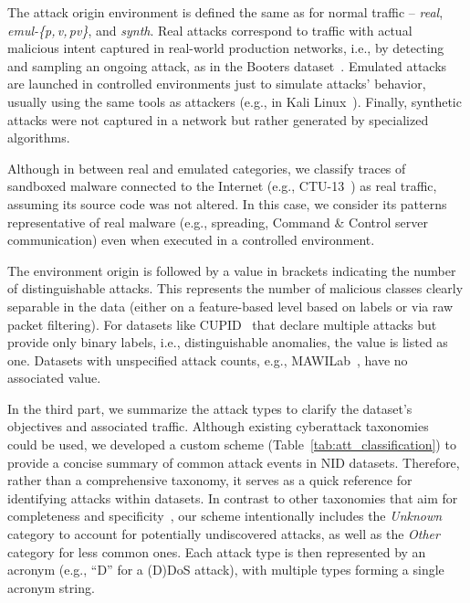 The attack origin environment is defined the same as for normal traffic -- \emph{real}, \emph{emul-\{p,\,v,\,pv\}}, and \emph{synth}. Real attacks correspond to traffic with actual malicious intent captured in real-world production networks, i.e., by detecting and sampling an ongoing attack, as in the Booters dataset~\cite{santanna2015_booters}. Emulated attacks are launched in controlled environments just to simulate attacks' behavior, usually using the same tools as attackers (e.g., in Kali Linux~\cite{kali_linux}). Finally, synthetic attacks were not captured in a network but rather generated by specialized algorithms.

Although in between real and emulated categories, we classify traces of sandboxed malware connected to the Internet (e.g., CTU-13~\cite{garcia2014_ctu13}) as real traffic, assuming its source code was not altered. In this case, we consider its patterns representative of real malware (e.g., spreading, Command \& Control server communication) even when executed in a controlled environment.

The environment origin is followed by a value in brackets indicating the number of distinguishable attacks. This represents the number of malicious classes clearly separable in the data (either on a feature-based level based on labels or via raw packet filtering). For datasets like CUPID~\cite{lawrence2022_cupid} that declare multiple attacks but provide only binary labels, i.e., distinguishable anomalies, the value is listed as one. Datasets with unspecified attack counts, e.g., MAWILab~\cite{fontugne2010_mawilab}, have no associated value.

In the third part, we summarize the attack types to clarify the dataset's objectives and associated traffic.
Although existing cyberattack taxonomies~\cite{santos2025_towards_robust_cyberattack_taxonomies,derbyshire2018_analysis_cybersec_attack_taxonomies} could be used, we developed a custom scheme (Table~\ref{tab:att_classification}) to provide a concise summary of common attack events in NID datasets. Therefore, rather than a comprehensive taxonomy, it serves as a quick reference for identifying attacks within datasets. In contrast to other taxonomies that aim for completeness and specificity~\cite{santos2025_towards_robust_cyberattack_taxonomies}, our scheme intentionally includes the \emph{Unknown} category to account for potentially undiscovered attacks, as well as the \emph{Other} category for less common ones. Each attack type is then represented by an acronym (e.g., ``D'' for a (D)DoS attack), with multiple types forming a single acronym string.

